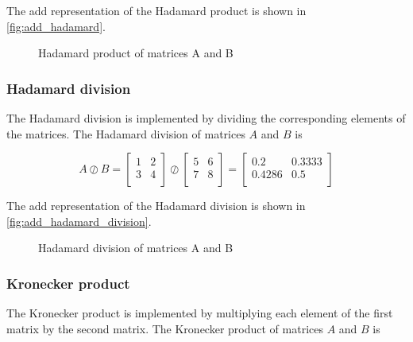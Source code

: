 The \gls{add} representation of the Hadamard product is shown in \autoref{fig:add_hadamard}.

\begin{figure}
    \centering
    
    \caption{Hadamard product of matrices A and B}
    \label{fig:add_hadamard}
\end{figure}

\subsubsection{Hadamard division}
The Hadamard division is implemented by dividing the corresponding elements of the matrices.
The Hadamard division of matrices $A$ and $B$ is

\[
    A \oslash B = \begin{bmatrix}
                      1 & 2 \\
                      3 & 4 \\
    \end{bmatrix} \oslash \begin{bmatrix}
                              5 & 6 \\
                              7 & 8 \\
    \end{bmatrix} = \begin{bmatrix}
                        0.2    & 0.3333 \\
                        0.4286 & 0.5    \\
    \end{bmatrix}
\]

The \gls{add} representation of the Hadamard division is shown in \autoref{fig:add_hadamard_division}.

\begin{figure}
    \centering
    
    \caption{Hadamard division of matrices A and B}
    \label{fig:add_hadamard_division}
\end{figure}

\subsubsection{Kronecker product}
The Kronecker product is implemented by multiplying each element of the first matrix by the second matrix.
The Kronecker product of matrices $A$ and $B$ is

